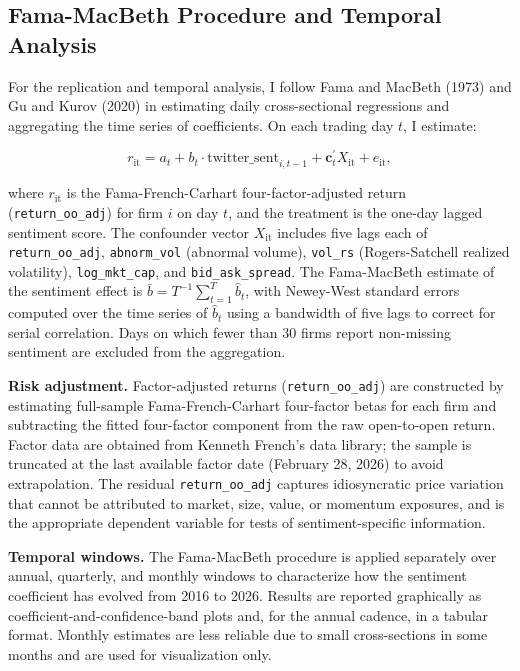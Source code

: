 \subsection{Fama-MacBeth Procedure and Temporal
Analysis}\label{fama-macbeth-procedure-and-temporal-analysis}

For the replication and temporal analysis, I follow Fama and MacBeth
(1973) and Gu and Kurov (2020) in estimating daily cross-sectional
regressions and aggregating the time series of coefficients. On each
trading day \(t\), I estimate:

\[r_{\text{it}} = a_{t} + b_{t} \cdot \text{twitter\_sent}_{i,t - 1} + \mathbf{c}_{t}^{'}X_{\text{it}} + e_{\text{it}},\]

where \(r_{\text{it}}\) is the Fama-French-Carhart four-factor-adjusted
return (\texttt{return\_oo\_adj}) for firm \(i\) on day \(t\), and the
treatment is the one-day lagged sentiment score. The confounder vector
\(X_{\text{it}}\) includes five lags each of \texttt{return\_oo\_adj},
\texttt{abnorm\_vol} (abnormal volume), \texttt{vol\_rs}
(Rogers-Satchell realized volatility), \texttt{log\_mkt\_cap}, and
\texttt{bid\_ask\_spread}. The Fama-MacBeth estimate of the sentiment
effect is \(\bar{b} = T^{- 1}\sum_{t = 1}^{T}{\widehat{b}}_{t}\), with
Newey-West standard errors computed over the time series of
\({\widehat{b}}_{t}\) using a bandwidth of five lags to correct for
serial correlation. Days on which fewer than 30 firms report non-missing
sentiment are excluded from the aggregation.

\textbf{Risk adjustment.} Factor-adjusted returns
(\texttt{return\_oo\_adj}) are constructed by estimating full-sample
Fama-French-Carhart four-factor betas for each firm and subtracting the
fitted four-factor component from the raw open-to-open return. Factor
data are obtained from Kenneth French's data library; the sample is
truncated at the last available factor date (February 28, 2026) to avoid
extrapolation. The residual \texttt{return\_oo\_adj} captures
idiosyncratic price variation that cannot be attributed to market, size,
value, or momentum exposures, and is the appropriate dependent variable
for tests of sentiment-specific information.

\textbf{Temporal windows.} The Fama-MacBeth procedure is applied
separately over annual, quarterly, and monthly windows to characterize
how the sentiment coefficient has evolved from 2016 to 2026. Results are
reported graphically as coefficient-and-confidence-band plots and, for
the annual cadence, in a tabular format. Monthly estimates are less
reliable due to small cross-sections in some months and are used for
visualization only.

